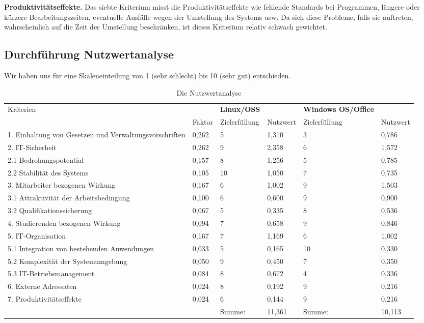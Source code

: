 \documentclass[12pt,utf8]{scrartcl}
\begin{document}
\textbf{Produktivitätseffekte.} Das siebte Kriterium misst die Produktivitätseffekte wie fehlende Standards bei Programmen, längere oder kürzere Bearbeitungszeiten, eventuelle Ausfälle wegen der Umstellung des Systems usw. Da sich diese Probleme, falls sie auftreten, wahrscheinlich auf die Zeit der Umstellung beschränken, ist dieses Kriterium relativ schwach gewichtet. 

\newpage
\subsection*{Durchführung Nutzwertanalyse}

Wir haben uns für eine Skaleneinteilung von 1 (sehr schlecht) bis 10 (sehr gut) entschieden. 

\begin{table}[h]
\centering
\begin{tabular}{|p{5cm}|p{1cm}|p{}|p{2cm}|p{}|p{2cm}|}
\hline
Kriterien & & \textbf{Linux/OSS} & & \textbf{Windows OS/Office} & \\
 & Faktor & Zielerfüllung & Nutzwert & Zielerfüllung & Nutzwert \\
\hline
1. Einhaltung von Gesetzen und Verwaltungsvorschriften & 0,262 & 5 & 1,310 & 3 & 0,786 \\
\hline
2. IT-Sicherheit & 0,262 & 9 & 2,358 & 6 & 1,572 \\
\hline
2.1 Bedrohungspotential & 0,157 & 8 & 1,256 & 5 & 0,785 \\
\hline
2.2 Stabilität des Systems & 0,105 & 10 & 1,050 & 7 & 0,735 \\
\hline
3. Mitarbeiter bezogenen Wirkung & 0,167 & 6 & 1,002 & 9 & 1,503 \\
\hline
3.1 Attraktivität der Arbeitsbedingung & 0,100 & 6 & 0,600 & 9 & 0,900 \\
\hline
3.2 Qualifikationssicherung & 0,067 & 5 & 0,335 & 8 & 0,536 \\
\hline
4. Studierenden bezogenen Wirkung & 0,094 & 7 & 0,658 & 9 & 0,846 \\
\hline
5. IT-Organisation & 0,167 & 7 & 1,169 & 6 & 1,002 \\
\hline
5.1 Integration von bestehenden Anwendungen & 0,033 & 5 & 0,165 & 10 & 0,330 \\
\hline
5.2 Komplexität der Systemumgebung & 0,050 & 9 & 0,450 & 7 & 0,350 \\
\hline
5.3 IT-Betriebsmanagement & 0,084 & 8 & 0,672 & 4 & 0,336 \\
\hline
6. Externe Adressaten & 0,024 & 8 & 0,192 & 9 & 0,216 \\
\hline
7. Produktivitätseffekte & 0,024 & 6 & 0,144 & 9 & 0,216 \\
\hline
 & & Summe: & 11,361 & Summe: & 10,113 \\
\hline
\end{tabular}
\caption*{Die Nutzwertanalyse}
\end{table}
\end{document}
